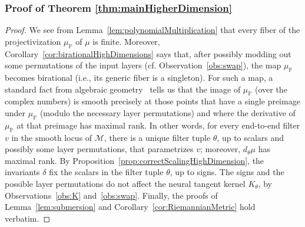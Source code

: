 \documentclass[twoside]{article}
\theoremstyle{definition}
\theoremstyle{remark}
\begin{document}
\subsubsection{Proof of Theorem \ref{thm:mainHigherDimension}}
\begin{proof}
    We see from Lemma~\ref{lem:polynomialMultiplication} that every fiber of the projectivization $\mu_\mathbb{P}$ of $\mu$ is finite.
    Moreover, Corollary~\ref{cor:birationalHighDimensions} says that, after possibly modding out some permutations of the input layers (cf. Observation~\ref{obs:swap}), the map $\mu_\mathbb{P}$ becomes birational (i.e., its generic fiber is a singleton).
    For such a map, a standard fact from algebraic geometry~\cite[Lemma~3.2]{kohn2017secants} tells us that the image of $\mu_\mathbb{P}$ (over the complex numbers) is smooth precisely at those points that have a single preimage under $\mu_\mathbb{P}$ (modulo the necessary layer permutations) and where the derivative of $\mu_\mathbb{P}$ at that preimage has maximal rank.  
    In other words,
    for every end-to-end filter $v$ in the smooth locus of $\mathcal{M}$, there is a unique filter tuple $\theta$, up to scalars and possibly some layer permutations, that parametrizes $v$; moreover, $d_\theta\mu$ has maximal rank.
    By Proposition~\ref{prop:correctScalingHighDimension}, the invariants $\delta$ fix the scalars in the filter tuple $\theta$, up to signs. 
    The signs and the possible layer permutations do not affect the neural tangent kernel $K_\theta$, by Observations~\ref{obs:K} and~\ref{obs:swap}.
    Finally, the proofs of Lemma~\ref{lem:submersion} and Corollary~\ref{cor:RiemannianMetric} hold verbatim.
\end{proof}
\end{document}
